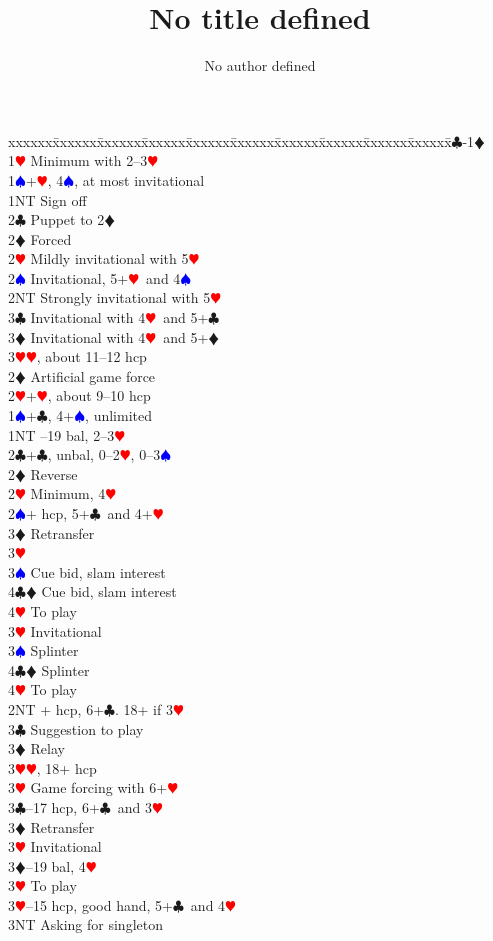 \documentclass[a4paper]{article}
\title{No title defined}
\author{No author defined}
\newcommand{\BC}{\textcolor{OliveGreen}{$\clubsuit$}}
\newcommand{\BD}{\textcolor{RedOrange}{$\vardiamondsuit$}}
\newcommand{\BH}{\textcolor{Red}{$\varheartsuit${}}}
\newcommand{\BS}{\textcolor{Blue}{$\spadesuit${}}}
\newenvironment{bidtable}
{\begin{tabbing}

xxxxxx\=xxxxxx\=xxxxxx\=xxxxxx\=xxxxxx\=xxxxxx\=xxxxxx\=xxxxxx\=xxxxxx\=xxxxxx\=\kill}
{\end{tabbing} }%
\begin{document}
\maketitle
\tableofcontents

\begin{bidtable}
1\BC-1\BD\+\\
1\BH \> Minimum with 2--3\BH \+\\
1\BS {}+\BH , 4\BS , at most invitational\\
1NT \> Sign off\\
2\BC \> Puppet to 2\BD \+\\
2\BD \> Forced\+\\
2\BH \> Mildly invitational with 5\BH \\
2\BS \> Invitational, 5+\BH\ and 4\BS \\
2NT \> Strongly invitational with 5\BH \\
3\BC \> Invitational with 4\BH\ and 5+\BC \\
3\BD \> Invitational with 4\BH\ and 5+\BD \\
3\BH {}\BH , about 11--12 hcp\-\-\\
2\BD \> Artificial game force\\
2\BH {}+\BH , about 9--10 hcp\-\\
1\BS {}+\BC , 4+\BS , unlimited\\
1NT --19 bal, 2--3\BH \\
2\BC {}+\BC , unbal, 0--2\BH , 0--3\BS \\
2\BD \> Reverse\\
2\BH \> Minimum, 4\BH \\
2\BS {}+ hcp, 5+\BC\ and 4+\BH \+\\
3\BD \> Retransfer\+\\
3\BH\+\\
3\BS \> Cue bid, slam interest\\
4\BC\BD \> Cue bid, slam interest\\
4\BH \> To play\-\-\\
3\BH \> Invitational\\
3\BS \> Splinter\\
4\BC\BD \> Splinter\\
4\BH \> To play\-\\
2NT + hcp, 6+\BC . 18+ if 3\BH \+\\
3\BC \> Suggestion to play\\
3\BD \> Relay\+\\
3\BH {}\BH , 18+ hcp\-\\
3\BH \> Game forcing with 6+\BH \-\\
3\BC {}--17 hcp, 6+\BC\ and 3\BH \+\\
3\BD \> Retransfer\\
3\BH \> Invitational\-\\
3\BD {}--19 bal, 4\BH \+\\
3\BH \> To play\-\\
3\BH {}--15 hcp, good hand, 5+\BC\ and 4\BH \+\\
3NT \> Asking for singleton\-\-
\end{bidtable}
\bigbreak
\end{document}
